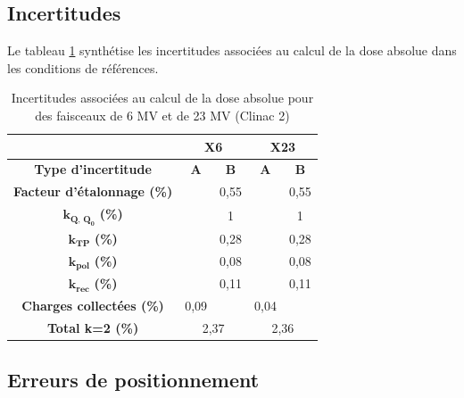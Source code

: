 \documentclass{article}
\begin{document}
\newpage
\subsection{Incertitudes}

Le tableau \ref*{table_incertitudes_abs} synthétise les incertitudes associées au calcul de la dose absolue dans les conditions de références.

\begin{table}[h]
  \centering
  \begin{tabular}{c|cc|cc|}
  \cline{2-5}
                                                           & \multicolumn{2}{c|}{\textbf{X6}} & \multicolumn{2}{c|}{\textbf{X23}} \\ \hline
  \multicolumn{1}{|c|}{\textbf{Type d'incertitude}}        & \textbf{A}      & \textbf{B}     & \textbf{A}      & \textbf{B}      \\ \hline
  \multicolumn{1}{|c|}{\textbf{Facteur d'étalonnage (\%)}} &                 & 0,55           &                 & 0,55            \\
  \multicolumn{1}{|c|}{$\mathbf{k_{Q,\,Q_0}}$ \textbf{(\%)}}                &                 & 1              &                 & 1               \\
  \multicolumn{1}{|c|}{$\mathbf{k_{TP}}$ \textbf{(\%)}}                  &                 & 0,28           &                 & 0,28            \\
  \multicolumn{1}{|c|}{$\mathbf{k_{pol}}$ \textbf{(\%)}}                 &                 & 0,08           &                 & 0,08            \\
  \multicolumn{1}{|c|}{$\mathbf{k_{rec}}$ \textbf{(\%)}}                 &                 & 0,11           &                 & 0,11            \\
  \multicolumn{1}{|c|}{\textbf{Charges collectées (\%)}}   & 0,09            &                & 0,04            &                 \\ \hline
  \multicolumn{1}{|c|}{\textbf{Total k=2 (\%)}}            & \multicolumn{2}{c|}{2,37}        & \multicolumn{2}{c|}{2,36}         \\ \hline
  \end{tabular}
  \caption{Incertitudes associées au calcul de la dose absolue pour des faisceaux de 6 MV et de 23 MV (Clinac 2)}
  \label{table_incertitudes_abs}
\end{table}

\subsection{Erreurs de positionnement}
\end{document}
